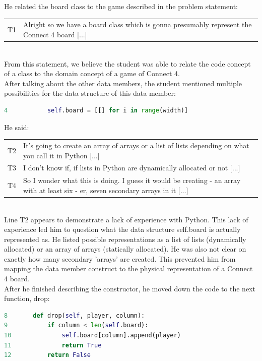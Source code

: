 He related the board class to the game described in the problem statement: \\
\begin{tabular}{lp{13cm}}
T1& Alright so we have a board class which is gonna presumably represent the Connect 4 board [...]\\
\end{tabular} \\
From this statement, we believe the student was able to relate the code concept of a class to the domain concept of a game of Connect 4. \\

After talking about the other data members, the student mentioned multiple possibilities for the data structure of this data member:
\begin{lstlisting}[language=python]
4 			self.board = [[] for i in range(width)]
\end{lstlisting}

He said: \\
\begin{tabular}{lp{13cm}}
T2& It's going to create an array of arrays or a list of lists depending on what you call it in Python [...] \\
T3& I don't know if, if lists in Python are dynamically allocated or not [...] \\
T4& So I wonder what this is doing. I guess it would be creating - an array with at least six - er, seven secondary arrays in it [...]\\
\end{tabular}\\
Line T2 appears to demonstrate a lack of experience with Python.  
This lack of experience led him to question what the data structure self.board is actually represented as.
He listed possible representations as a list of lists (dynamically allocated) or an array of arrays (statically allocated). He was also not clear on exactly how many secondary 'arrays' are created. 
This prevented him from mapping the data member construct to the physical representation of a Connect 4 board. \\


After he finished describing the constructor, he moved down the code to the next function, drop:
\begin{lstlisting}[language=python]
8 		def drop(self, player, column):
9 			if column < len(self.board):
10				self.board[column].append(player)
11				return True
12			return False
\end{lstlisting} 

